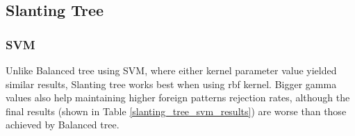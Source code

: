 \subsection{Slanting Tree}

\subsubsection{SVM}

Unlike Balanced tree using SVM, where either kernel parameter value yielded similar results, Slanting tree works best when using rbf kernel. Bigger gamma values also help maintaining higher foreign patterns rejection rates, although the final results (shown in Table \ref{slanting_tree_svm_results}) are worse than those achieved by Balanced tree.

\begin{table}[htp]
	\centering
	\caption{Results for Slanting tree using SVM classifier with C=16, gamma=0.5 and kernel=rbf}
	\label{slanting_tree_svm_results}
\end{table}
